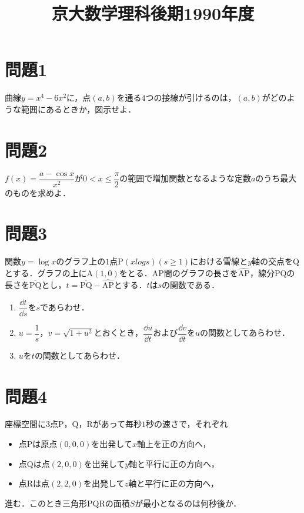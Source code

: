 \documentclass[unicode,12pt, A4j]{ltjsarticle}%
\title{京大数学理科後期1990年度}
\author{}
\date{}
\begin{document}
\maketitle

\section{問題1}
曲線$y=x^4-6x^2$に，点$(a,b)$を通る$4$つの接線が引けるのは，$(a,b)$がどのような範囲にあるときか，図示せよ．


\section{問題2}
$f(x)=\dfrac{a-\cos x}{x^2}$が$0 < x \le \dfrac{\pi}{2}$の範囲で増加関数となるような定数$a$のうち最大のものを求めよ．


\section{問題3}
関数$y=\log x$のグラフ上の$1$点$\mathrm{P}(xlog s) (s\ge 1)$における雪線と$y$軸の交点を$\mathrm{Q}$とする．グラフの上に$\mathrm{A}(1,0)$をとる．$\mathrm{AP}$間のグラフの長さを$\hat{\mathrm{AP}}$，線分$\mathrm{PQ}$の長さを$\overline{\mathrm{PQ}}$とし，$t=\overline{\mathrm{PQ}}-\hat{\mathrm{AP}}$とする．$t$は$s$の関数である．

\begin{enumerate}
 \item $\dfrac{\dd t}{\dd s}$を$s$であらわせ．
 \item $u=\dfrac{1}{s}$，$v=\sqrt{1+u^2}$とおくとき，$\dfrac{\dd u}{\dd t}$および$\dfrac{\dd v}{\dd t}$を$u$の関数としてあらわせ．
 \item $u$を$t$の関数としてあらわせ．
\end{enumerate}


\section{問題4}
座標空間に$3$点$\mathrm{P}$，$\mathrm{Q}$，$\mathrm{R}$があって毎秒$1$秒の速さで，それぞれ
\begin{itemize}
 \item 点$\mathrm{P}$は原点$(0,0,0)$を出発して$x$軸上を正の方向へ，
 \item 点$\mathrm{Q}$は点$(2,0,0)$を出発して$y$軸と平行に正の方向へ，
 \item 点$\mathrm{R}$は点$(2,2,0)$を出発して$z$軸と平行に正の方向へ，
\end{itemize}
進む．このとき三角形$\mathrm{PQR}$の面積$S$が最小となるのは何秒後か．
\end{document}

